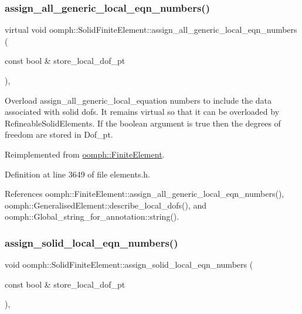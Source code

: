 \subsubsection{\texorpdfstring{assign\+\_\+all\+\_\+generic\+\_\+local\+\_\+eqn\+\_\+numbers()}{assign\_all\_generic\_local\_eqn\_numbers()}}
{\footnotesize\ttfamily virtual void oomph\+::\+Solid\+Finite\+Element\+::assign\+\_\+all\+\_\+generic\+\_\+local\+\_\+eqn\+\_\+numbers (\begin{DoxyParamCaption}\item[{const bool \&}]{store\+\_\+local\+\_\+dof\+\_\+pt }\end{DoxyParamCaption})\hspace{0.3cm}{\ttfamily [inline]}, {\ttfamily [virtual]}}



Overload assign\+\_\+all\+\_\+generic\+\_\+local\+\_\+equation numbers to include the data associated with solid dofs. It remains virtual so that it can be overloaded by Refineable\+Solid\+Elements. If the boolean argument is true then the degrees of freedom are stored in Dof\+\_\+pt. 



Reimplemented from \hyperlink{classoomph_1_1FiniteElement_a564ba080f68132762510b1ec9465b05d}{oomph\+::\+Finite\+Element}.



Definition at line 3649 of file elements.\+h.



References oomph\+::\+Finite\+Element\+::assign\+\_\+all\+\_\+generic\+\_\+local\+\_\+eqn\+\_\+numbers(), oomph\+::\+Generalised\+Element\+::describe\+\_\+local\+\_\+dofs(), and oomph\+::\+Global\+\_\+string\+\_\+for\+\_\+annotation\+::string().

\mbox{\label{classoomph_1_1SolidFiniteElement_a3c7ad30f234e87649ed34cea94f65ea3}} 
\subsubsection{\texorpdfstring{assign\+\_\+solid\+\_\+local\+\_\+eqn\+\_\+numbers()}{assign\_solid\_local\_eqn\_numbers()}}
{\footnotesize\ttfamily void oomph\+::\+Solid\+Finite\+Element\+::assign\+\_\+solid\+\_\+local\+\_\+eqn\+\_\+numbers (\begin{DoxyParamCaption}\item[{const bool \&}]{store\+\_\+local\+\_\+dof\+\_\+pt }\end{DoxyParamCaption})\hspace{0.3cm}{\ttfamily [protected]}, {\ttfamily [virtual]}}



